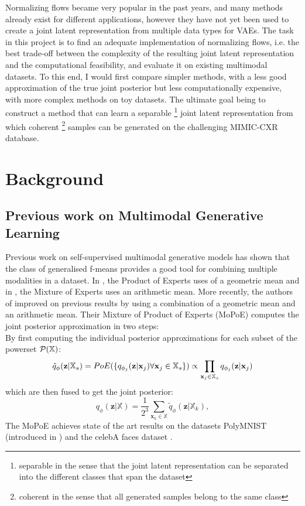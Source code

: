 \documentclass[english]{scrartcl}
\begin{document}
    Normalizing flows became very popular in the past years, and many methods already exist for different applications, however they have not yet been used to create a joint latent representation from multiple data types for VAEs.
    The task in this project is to find an adequate implementation of normalizing flows, i.e. the best trade-off between the complexity of the resulting joint latent representation and the computational feasibility, and evaluate it on existing multimodal datasets.
    To this end, I would first compare simpler methods, with a less good approximation of the true joint posterior but less computationally expensive, with more complex methods on toy datasets.
    The ultimate goal being to construct a method that can learn a separable \footnote{separable in the sense that the joint latent representation can be separated into the different classes that span the dataset} joint latent representation from which coherent \footnote{coherent in the sense that all generated samples belong to the same class} samples can be generated on the challenging MIMIC-CXR \parencite{johnson_mimic-cxr-jpg_2019} database.


    \section{Background}

    \subsection{Previous work on Multimodal Generative Learning} \label{subsec:prevwork_mopoe}
    Previous work on self-supervised multimodal generative models has shown that the class of generalised f-means provides a good tool for combining multiple modalities in a dataset.
    In \citep[PoE]{poe}, the Product of Experts uses of a geometric mean and in \citep[MoE]{shi_variational_2019}, the Mixture of Experts uses an arithmetic mean.
    More recently, the authors of \citep[MoPoE]{sutter_generalized_2020} improved on previous results by using a combination of a geometric mean and an arithmetic mean.
    Their Mixture of Product of Experts (MoPoE) computes the joint posterior approximation in two steps:\\
    By first computing the individual posterior approximations for each subset of the powerset $\mathcal{P}(\mathbb{X})$:
    \begin{equation}
        \tilde{q}_{\phi}(\textbf{z}|\mathbb{X}_s)=PoE(\{q_{\phi_j}(\textbf{z}|\textbf{x}_j) \forall \textbf{x}_j \in \mathbb{X}_s\}) \propto \prod _{\textbf{x}_j \in \mathbb{X}_s}q_{\phi_j}(\textbf{z}|\textbf{x}_j)
    \end{equation}
    which are then fused to get the joint posterior:
    \begin{equation}
        q_{\phi}(\textbf{z}|\mathbb{X}) = \frac{1}{2^3} \sum _{\textbf{x}_k \in \mathbb{X}} \tilde{q}_{\phi} (\textbf{z}|\mathbb{X}_k),
    \end{equation}
    The MoPoE achieves state of the art results on the datasets PolyMNIST (introduced in \citet{sutter_multimodal_2020}) and the celebA faces dataset \citep{liu_deep_2015}.
\end{document}
